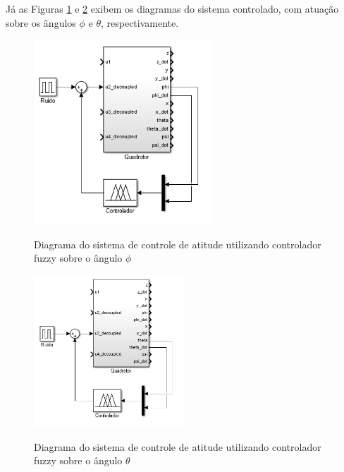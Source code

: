 Já as Figuras \ref{fig:u2_mamdani_blocks} e \ref{fig:u3_mamdani_blocks} exibem os diagramas do sistema controlado, com atuação sobre os ângulos $\phi$ e $\theta$, respectivamente.

\begin{figure}[!htb]
    \centering
    \caption{Diagrama do sistema de controle de atitude utilizando controlador fuzzy sobre o ângulo $\phi$}
    \includegraphics[width=0.6\textwidth]{./04-figuras/resultados/novos/simulink_printscreen_phi}
    \label{fig:u2_mamdani_blocks}
\end{figure}

\begin{figure}[!htb]
    \centering
    \caption{Diagrama do sistema de controle de atitude utilizando controlador fuzzy sobre o ângulo $\theta$}
    \includegraphics[width=0.5\textwidth]{./04-figuras/resultados/novos/simulink_printscreen_theta}
    \label{fig:u3_mamdani_blocks}
\end{figure}








